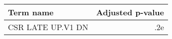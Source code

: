 \begin{tabular}{lr}
\toprule
        Term name &  Adjusted p-value \\
\midrule
CSR LATE UP.V1 DN &               .2e \\
\bottomrule
\end{tabular}
